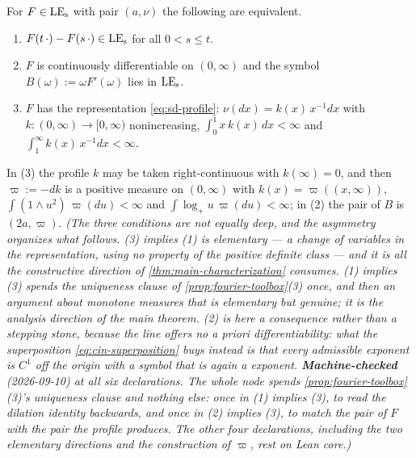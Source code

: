 \begin{lemma}\label{lem:selfdecomposable-exponents}
\leanok
{}
For $F \in \mathrm{LE}_{\mathrm{s}}$ with pair $(a,\nu)$ the following are equivalent.
\begin{enumerate}
\item $F(t\,\cdot) - F(s\,\cdot) \in \mathrm{LE}_{\mathrm{s}}$ for all $0 < s \le t$.
\item $F$ is continuously differentiable on $(0,\infty)$ and the symbol
$B(\omega) := \omega F'(\omega)$ lies in $\mathrm{LE}_{\mathrm{s}}$.
\item $F$ has the representation \ref{eq:sd-profile}: $\nu(dx) = k(x)\,x^{-1}dx$ with
$k : (0,\infty) \to [0,\infty)$ nonincreasing, $\int_0^1 x\,k(x)\,dx < \infty$ and
$\int_1^\infty k(x)\,x^{-1}dx < \infty$.
\end{enumerate}
In (3) the profile $k$ may be taken right-continuous with $k(\infty) = 0$, and then
$\varpi := -dk$ is a positive measure on $(0,\infty)$ with $k(x) = \varpi((x,\infty))$,
$\int (1 \wedge u^2)\,\varpi(du) < \infty$ and $\int \log_+ u\,\varpi(du) < \infty$; in (2) the
pair of $B$ is $(2a,\varpi)$.
\statusT\quad\emph{(The three conditions are not equally deep, and the asymmetry organizes
what follows. (3) implies (1) is elementary --- a change of variables in the representation,
using no property of the positive definite class --- and it is all the constructive direction
of \ref{thm:main-characterization} consumes. (1) implies (3) spends the uniqueness clause of
\ref{prop:fourier-toolbox}(3) once, and then an argument about monotone measures that is
elementary but genuine; it is the analysis direction of the main theorem. (2) is here a
consequence rather than a stepping stone, because the line offers no a priori
differentiability: what the superposition \ref{eq:cin-superposition} buys instead is that
every admissible exponent is $C^1$ off the origin with a symbol that is again a \Levy{}
exponent. \textbf{Machine-checked} (2026-09-10) at all six declarations. The whole node spends
\ref{prop:fourier-toolbox}(3)'s uniqueness clause and nothing else: once in (1) implies (3), to
read the dilation identity backwards, and once in (2) implies (3), to match the pair of $F$
with the pair the profile produces. The other four declarations, including the two elementary
directions and the construction of $\varpi$, rest on Lean core.)}
\end{lemma}

